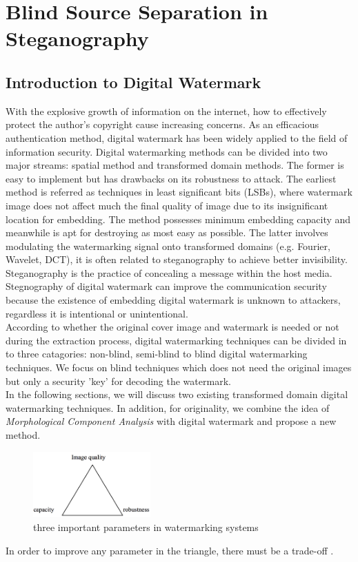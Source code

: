 \section{Blind Source Separation in Steganography}
\subsection{Introduction to Digital Watermark}
With the explosive growth of information on the internet, how to effectively protect the author's copyright cause increasing concerns. As an efficacious authentication method, digital watermark has been widely applied to the field of information security. Digital watermarking methods can be divided into two major streams: spatial method and transformed domain methods. The former is easy to implement but has drawbacks on its robustness to attack. The earliest method is referred as techniques in least significant bits (LSBs), where watermark image does not affect much the final quality of image due to its insignificant location for embedding. The method possesses minimum embedding capacity and meanwhile is apt for destroying as most easy as possible. The latter involves modulating the watermarking signal onto transformed domains (e.g. Fourier, Wavelet, DCT), it is often related to steganography to achieve better invisibility. Steganography is the practice of concealing a message within the host media. Stegnography of digital watermark can improve the communication security because the existence of embedding digital watermark is unknown to attackers, regardless it is intentional or unintentional. \\

According to whether the original cover image and watermark is needed or not during the extraction process, digital watermarking techniques can be divided in to three catagories: non-blind, semi-blind to blind digital watermarking techniques\cite{Yu2017}. We focus on blind techniques which does not need the original images but only a security 'key' for decoding the watermark.\\

In the following sections, we will discuss two existing transformed domain digital watermarking techniques. In addition, for originality, we combine the idea of \textit{Morphological Component Analysis} with digital watermark and propose a new method.\\

\begin{figure}[H]
\centering
\includegraphics[width=0.4\textwidth]{images/watermark_tradeoff.png}
\caption{ three important parameters in watermarking systems}
\label{trade-off}
\end{figure}
In order to improve any parameter in the triangle, there
must be a trade-off \cite{DCT_watermark}. 

